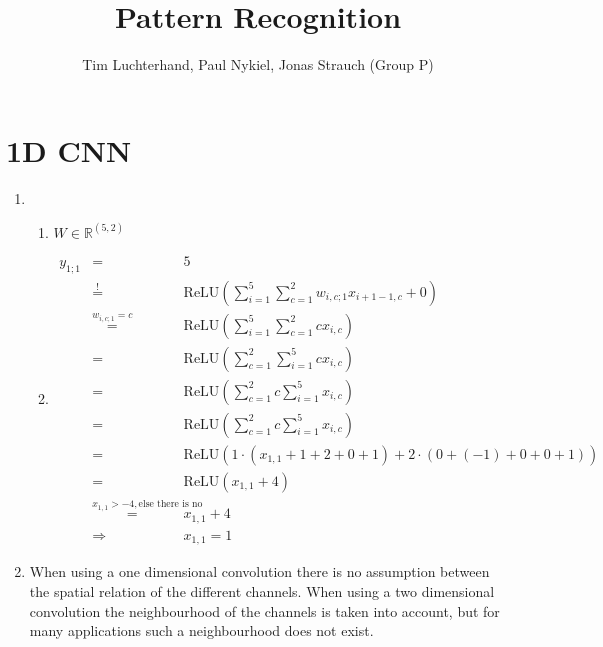 \documentclass[DIN, pagenumber=false, fontsize=11pt, parskip=half]{scrartcl}
\title{Pattern Recognition}
\author{Tim Luchterhand, Paul Nykiel, Jonas Strauch (Group P)}
\begin{document}
    \maketitle
    \section{1D CNN}
    \begin{enumerate}
        \item
            \begin{enumerate}
                \item $W \in \mathbb{R}^{(5, 2)}$
                \item
                    \begin{eqnarray*}
                        y_{1;1} &=& 5 \\
                            &\stackrel{!}{=}& \text{ReLU}\left( \sum_{i=1}^5 \sum_{c=1}^2 w_{i,c; 1} x_{i+1-1,c} + 0 \right) \\
                            &\stackrel{w_{i,c;1} = c}{=}& \text{ReLU}\left( \sum_{i=1}^5 \sum_{c=1}^2 c x_{i,c} \right) \\
                            &\stackrel{}{=}& \text{ReLU}\left( \sum_{c=1}^2 \sum_{i=1}^5 c x_{i,c} \right) \\
                            &\stackrel{}{=}& \text{ReLU}\left( \sum_{c=1}^2 c \sum_{i=1}^5 x_{i,c} \right) \\
                            &\stackrel{}{=}& \text{ReLU}\left( \sum_{c=1}^2 c \sum_{i=1}^5 x_{i,c} \right) \\
                            &\stackrel{}{=}& \text{ReLU}\left(1 \cdot (x_{1,1} + 1 + 2 + 0 +1) + 2 \cdot (0 + (-1) + 0 +0 + 1) \right) \\
                            &\stackrel{}{=}& \text{ReLU}\left(x_{1,1} + 4 \right) \\
                            &\stackrel{x_{1,1} > -4, \text{else there is no solution}}{=}& x_{1,1} + 4 \\
                            &\Rightarrow& x_{1,1} = 1
                    \end{eqnarray*}
            \end{enumerate}
        \item When using a one dimensional convolution there is no assumption between the spatial relation of the
            different channels. When using a two dimensional convolution the neighbourhood of the channels is taken
            into account, but for many applications such a neighbourhood does not exist.


\end{enumerate}
\end{document}
